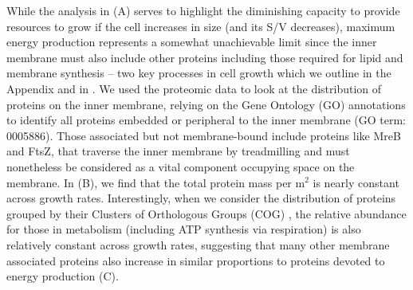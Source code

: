 While the analysis in (A) serves to highlight the
diminishing capacity to provide resources to grow if the cell increases in size
(and its S/V decreases), maximum energy production represents a somewhat
unachievable limit since the inner membrane must also include other proteins
including those required for lipid and membrane synthesis -- two key processes
in cell growth which we outline in the Appendix and in
. We used the proteomic data to look at the
distribution of proteins on the inner membrane, relying on the Gene Ontology
(GO) annotations \citep{ashburner2000, thegeneOntologyconsortium2018} to
identify all proteins embedded or peripheral to the inner membrane (GO term:
0005886). Those associated but not membrane-bound include proteins like MreB and
FtsZ, that traverse the inner membrane by treadmilling and must nonetheless be
considered as a vital component occupying space on the membrane. In
 (B), we find that the total protein mass per \textmu m$^2$
is nearly constant across growth rates. Interestingly, when we consider
the distribution of proteins grouped by their Clusters of Orthologous Groups
(COG) \citep{tatusov2000}, the relative abundance for those in metabolism
(including ATP synthesis via respiration) is also relatively constant across
growth rates, suggesting that many other membrane associated proteins also
increase in similar proportions to proteins devoted to energy production
 (C).


